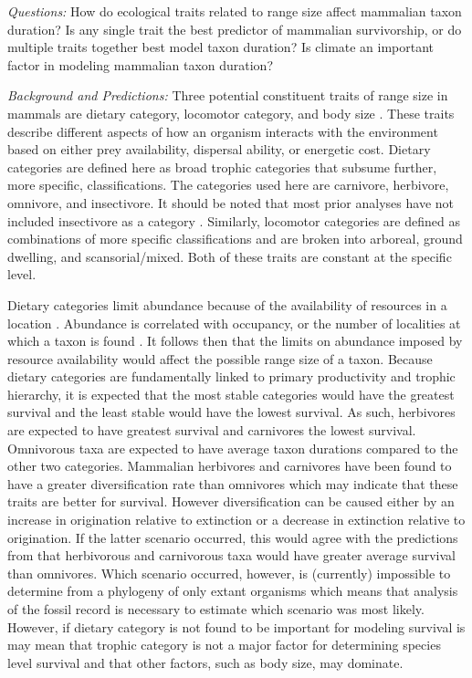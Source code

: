 \documentclass[12pt,letterpaper]{article}
\begin{document}
\textit{Questions:} 
How do ecological traits related to range size affect mammalian taxon duration? Is any single trait the best predictor of mammalian survivorship, or do multiple traits together best model taxon duration? Is climate an important factor in modeling mammalian taxon duration?

\textit{Background and Predictions:} 
Three potential constituent traits of range size in mammals are dietary category, locomotor category, and body size \citep{Smith2004,Smith2008b,Damuth1981a,Damuth1979,Jernvall2004,Lyons2005,Lyons2010}. These traits describe different aspects of how an organism interacts with the environment based on either prey availability, dispersal ability, or energetic cost. Dietary categories are defined here as broad trophic categories that subsume further, more specific, classifications. The categories used here are carnivore, herbivore, omnivore, and insectivore. It should be noted that most prior analyses have not included insectivore as a category \citep{Jernvall2004,Price2012}. Similarly, locomotor categories are defined as combinations of more specific classifications and are broken into arboreal, ground dwelling, and scansorial/mixed. Both of these traits are constant at the specific level. 

Dietary categories limit abundance because of the availability of resources in a location \citep{VanValen1989,Brown1987,Damuth1979,Silva1997,Janis2000}. Abundance is correlated with occupancy, or the number of localities at which a taxon is found \citep{Jernvall2002,Fortelius2002,Brown1984}. It follows then that the limits on abundance imposed by resource availability would affect the possible range size of a taxon. Because dietary categories are fundamentally linked to primary productivity and trophic hierarchy, it is expected that the most stable categories would have the greatest survival and the least stable would have the lowest survival. As such, herbivores are expected to have greatest survival and carnivores the lowest survival. Omnivorous taxa are expected to have average taxon durations compared to the other two categories. Mammalian herbivores and carnivores have been found to have a greater diversification rate than omnivores \citep{Price2012} which may indicate that these traits are better for survival. However diversification can be caused either by an increase in origination relative to extinction or a decrease in extinction relative to origination. If the latter scenario occurred, this would agree with the predictions from \citet{Price2012} that herbivorous and carnivorous taxa would have greater average survival than omnivores. Which scenario occurred, however, is (currently) impossible to determine from a phylogeny of only extant organisms \citep{Rabosky2010a} which means that analysis of the fossil record is necessary to estimate which scenario was most likely. However, if dietary category is not found to be important for modeling survival is may mean that trophic category is not a major factor for determining species level survival and that other factors, such as body size, may dominate. 
\end{document}
